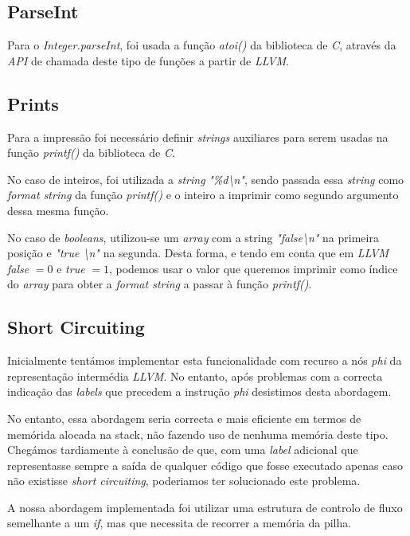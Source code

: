 \documentclass[11pt,a4paper]{article}
\begin{document}
\subsection{ParseInt}

Para o \textit{Integer.parseInt}, foi usada a função \textit{atoi()} da biblioteca de \textit{C}, através da \textit{API} de chamada deste tipo de funções a partir de \textit{LLVM}.

\subsection{Prints}

Para a impressão foi necessário definir \textit{strings} auxiliares para serem usadas na função \textit{printf()} da biblioteca de \textit{C}.

No caso de inteiros, foi utilizada a \textit{string} \textit{"\%d\textbackslash n"}, sendo passada essa \textit{string} como \textit{format string} da função \textit{printf()} e o inteiro a imprimir como segundo argumento dessa mesma função.

No caso de \textit{booleans}, utilizou-se um \textit{array} com a string \textit{"false\textbackslash n"} na primeira posição e \textit{"true \textbackslash n"} na segunda. Desta forma, e tendo em conta que em \textit{LLVM} \textit{false} $= 0$ e \textit{true} $= 1$, podemos usar o valor que queremos imprimir como índice do \textit{array} para obter a \textit{format string} a passar à função \textit{printf()}.

\subsection{Short Circuiting}

Inicialmente tentámos implementar esta funcionalidade com recurso a nós \textit{phi} da representação intermédia \textit{LLVM}. No entanto, após problemas com a correcta indicação das \textit{labels} que precedem a instrução \textit{phi} desistimos desta abordagem.

No entanto, essa abordagem seria correcta e mais eficiente em termos de memórida alocada na stack, não fazendo uso de nenhuma memória deste tipo. Chegámos tardiamente à conclusão de que, com uma \textit{label} adicional que representasse sempre a saída de qualquer código que fosse executado apenas caso não existisse \textit{short circuiting}, poderiamos ter solucionado este problema.

A nossa abordagem implementada foi utilizar uma estrutura de controlo de fluxo semelhante a um \textit{if}, mas que necessita de recorrer a memória da pilha.
\end{document}
